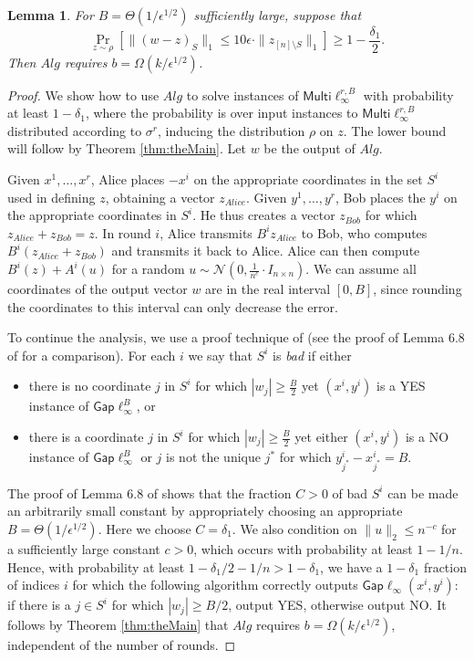 \documentclass[twoside,leqno,twocolumn]{article}
\newtheorem{lemma}[theorem]{Lemma}
\newcommand{\gaplinf}{\mathsf{Gap}\ell_{\infty}}
\newcommand{\multiLinf}{\mathsf{Multi}\ell_{\infty}}
\def\eps{\epsilon}
\begin{document}
\begin{lemma}\label{lem:oneSide}
For $B = \Theta(1/\eps^{1/2})$ sufficiently large, suppose that 
$$\Pr_{z \sim \rho}[\|(w-z)_S\|_1 \leq 10\eps \cdot \|z_{[n] \setminus S}\|_1] \geq 1-\frac{\delta_1}{2}.$$ 
Then $Alg$ requires $b = \Omega(k/\eps^{1/2})$. 
\end{lemma}
\begin{proof}
We show how to use $Alg$ to solve instances of $\multiLinf^{r,B}$
  with probability at least $1-\delta_1$, where the probability is
  over input instances to $\multiLinf^{r,B}$ distributed according to
  $\sigma^r$, inducing the distribution $\rho$ on $z$. The lower bound will
  follow by Theorem \ref{thm:theMain}. Let $w$ be the output of 
  $Alg$. 

  Given $x^1, \ldots, x^r$, Alice places $-x^i$ on the appropriate
  coordinates in the set $S^i$ used in defining $z$, obtaining a
  vector $z_{Alice}$. 
  Given $y^1, \ldots, y^r$, Bob places the $y^i$ on the appropriate
  coordinates in $S^i$. He thus creates a vector $z_{Bob}$ for which
  $z_{Alice} + z_{Bob} = z$. In round $i$, Alice transmits $B^iz_{Alice}$
  to Bob, who computes $B^i(z_{Alice} + z_{Bob})$ and transmits it back 
  to Alice. Alice can then compute $B^i(z) + A^i(u)$ for a random
  $u \sim \mathcal{N}(0, \frac{1}{n^c} \cdot I_{n \times n})$. 
  We can assume all
  coordinates of the output vector $w$ are in the real interval $[0,B]$, since rounding the
  coordinates to this interval can only decrease the error.

  To continue the analysis, we use a proof technique of \cite{PW11} (see the proof
of Lemma 6.8 of \cite{PW11} for a comparison). 
For each $i$ we say that $S^i$ is {\it bad} if either
\begin{itemize}
\item there is no coordinate $j$ in $S^i$ for which $|w_j| \geq \frac{B}{2}$
yet $(x^i, y^i)$ is a YES instance of $\gaplinf^B$, or
\item there is a coordinate $j$ in $S^i$ for which $|w_j| \geq \frac{B}{2}$
yet either $(x^i, y^i)$ is a NO instance of $\gaplinf^B$ or $j$ is
not the unique $j^*$ for which $y_{j^*}^i - x_{j^*}^i = B$. 
\end{itemize}
  The proof of Lemma 6.8 of \cite{PW11} shows that the fraction $C > 0$ of bad $S^i$ can be made
  an arbitrarily small constant by appropriately choosing an appropriate $B = \Theta(1/\eps^{1/2})$.
  Here we choose $C = \delta_1$. We also condition on $\|u\|_2\leq n^{-c}$ for a sufficiently
  large constant $c > 0$, which occurs
  with probability at least $1-1/n$. Hence, with probability at least $1-\delta_1/2-1/n > 1-\delta_1$,
  we have a $1-\delta_1$ fraction of indices $i$ for which the following algorithm
  correctly outputs $\gaplinf(x^i, y^i)$: if there is a $j \in S^i$
  for which $|w_j| \geq B/2$, output YES, otherwise output NO. 
  It follows by Theorem \ref{thm:theMain} that $Alg$
  requires $ b = \Omega(k/\eps^{1/2})$, independent of the number
  of rounds.
\end{proof}
\end{document}
